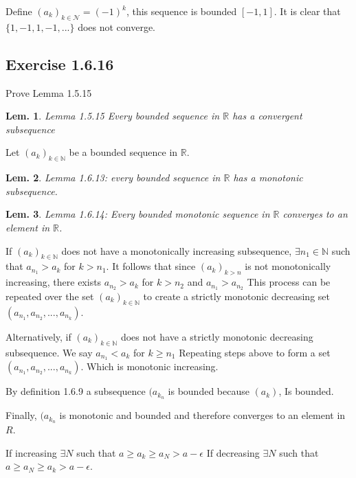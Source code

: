 \documentclass{tufte-book}
\theoremstyle{mytheoremstyle}
\theoremstyle{mylemstyle}
\newtheorem*{lem}{Lem.}
\theoremstyle{mydefstyle}
\begin{document}
Define $(a_k)_{k \in \mathcal{N}} = (-1)^k$, this sequence is bounded $[-1,1]$.  It is clear that $\{1,-1,1,-1,...\}$ does not converge.

\subsection{Exercise 1.6.16}
Prove Lemma 1.5.15
\begin{lem}Lemma 1.5.15 Every bounded sequence in $\mathbb{R}$ has a convergent subsequence\end{lem} 

Let $(a_k)_{k \in \mathbb{N}}$ be a bounded sequence in $\mathbb{R}$.

\begin{lem}Lemma 1.6.13: every bounded sequence in $\mathbb{R}$ has a monotonic subsequence.
\end{lem}

\begin{lem}Lemma 1.6.14: Every bounded monotonic sequence in $\mathbb{R}$ converges to an element in $\mathbb{R}$. 
\end{lem}

If $(a_k)_{k \in \mathbb{N}}$ does not have a monotonically increasing subsequence, $\exists n_1 \in \mathbb{N}$ such that $a_{n_{1}} > a_k$ for $k > n_1$. It follows that since $(a_k)_{k>n}$ is not monotonically increasing, there exists $a_{n_{2}} > a_k$ for $k > n_2$ and $a_{n_{1}} > a_{n_{2}}$ 
This process can be repeated over the set $(a_k)_{k \in \mathbb{N}}$ to create a strictly monotonic decreasing set $(a_{n_{1}}, a_{n_{2}}, ..., a_{n_{k}})$.

Alternatively, if $(a_k)_{k \in \mathbb{N}}$ does not have a strictly monotonic decreasing subsequence.  We say $a_{n_{1}} < a_k$  for $k \geq n_1$ Repeating steps above to form a set $(a_{n_{1}}, a_{n_{2}}, ..., a_{n_{k}})$. Which is monotonic increasing.

By definition 1.6.9 a subsequence $(a_{k_{n}}$ is bounded because $(a_{k})$, Is bounded.

Finally, $(a_{k_{n}}$ is monotonic and bounded and therefore converges to an element in ${R}$.

If increasing $\exists N$ such that $a \geq a_k \geq a_N > a - \epsilon$  If decreasing $\exists N$ such that $a \geq a_N \geq a_k > a - \epsilon$.
\end{document}
